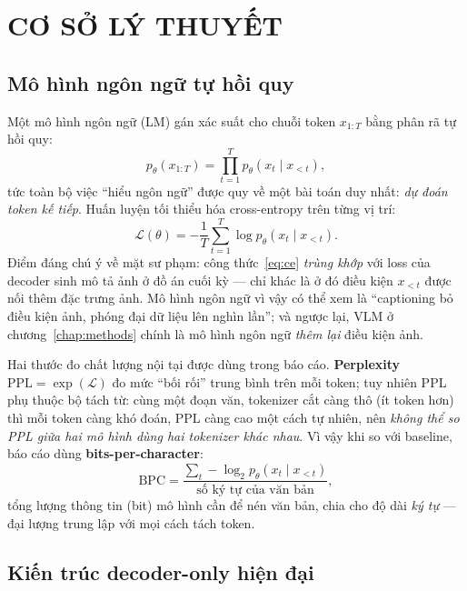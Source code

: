 \chapter{CƠ SỞ LÝ THUYẾT}
\label{chap:background}

\section{Mô hình ngôn ngữ tự hồi quy}
\label{sec:bg-lm}

Một mô hình ngôn ngữ (LM) gán xác suất cho chuỗi token $x_{1:T}$ bằng phân rã
tự hồi quy:
\begin{equation}
	p_\theta(x_{1:T}) = \prod_{t=1}^{T} p_\theta(x_t \mid x_{<t}),
	\label{eq:autoregressive}
\end{equation}
tức toàn bộ việc ``hiểu ngôn ngữ'' được quy về một bài toán duy nhất:
\emph{dự đoán token kế tiếp}. Huấn luyện tối thiểu hóa cross-entropy trên
từng vị trí:
\begin{equation}
	\mathcal{L}(\theta) = -\frac{1}{T}\sum_{t=1}^{T} \log p_\theta(x_t \mid x_{<t}).
	\label{eq:ce}
\end{equation}
Điểm đáng chú ý về mặt sư phạm: công thức~\eqref{eq:ce} \emph{trùng khớp} với
loss của decoder sinh mô tả ảnh ở đồ án cuối kỳ --- chỉ khác là ở đó điều kiện
$x_{<t}$ được nối thêm đặc trưng ảnh. Mô hình ngôn ngữ vì vậy có thể xem là
``captioning bỏ điều kiện ảnh, phóng đại dữ liệu lên nghìn lần''; và ngược
lại, VLM ở chương~\ref{chap:methods} chính là mô hình ngôn ngữ \emph{thêm lại}
điều kiện ảnh.

Hai thước đo chất lượng nội tại được dùng trong báo cáo. \textbf{Perplexity}
$\mathrm{PPL} = \exp(\mathcal{L})$ đo mức ``bối rối'' trung bình trên mỗi
token; tuy nhiên PPL phụ thuộc bộ tách từ: cùng một đoạn văn, tokenizer cắt
càng thô (ít token hơn) thì mỗi token càng khó đoán, PPL càng cao một cách tự
nhiên, nên \emph{không thể so PPL giữa hai mô hình dùng hai tokenizer khác
nhau}. Vì vậy khi so với baseline, báo cáo dùng \textbf{bits-per-character}:
\begin{equation}
	\mathrm{BPC} = \frac{\sum_t -\log_2 p_\theta(x_t \mid x_{<t})}{\text{số ký tự của văn bản}},
	\label{eq:bpc}
\end{equation}
tổng lượng thông tin (bit) mô hình cần để nén văn bản, chia cho độ dài
\emph{ký tự} --- đại lượng trung lập với mọi cách tách token.

\section{Kiến trúc decoder-only hiện đại}
\label{sec:bg-arch}

